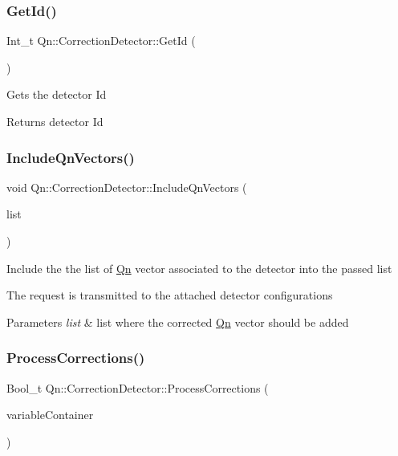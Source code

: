 \subsubsection{\texorpdfstring{Get\+Id()}{GetId()}}
{\footnotesize\ttfamily Int\+\_\+t Qn\+::\+Correction\+Detector\+::\+Get\+Id (\begin{DoxyParamCaption}{ }\end{DoxyParamCaption})\hspace{0.3cm}{\ttfamily [inline]}}

Gets the detector Id

\begin{DoxyReturn}{Returns}
detector Id 
\end{DoxyReturn}
\mbox{\label{classQn_1_1CorrectionDetector_a46b40b3743208bcf3cddd063690985e8}} 
\subsubsection{\texorpdfstring{Include\+Qn\+Vectors()}{IncludeQnVectors()}}
{\footnotesize\ttfamily void Qn\+::\+Correction\+Detector\+::\+Include\+Qn\+Vectors (\begin{DoxyParamCaption}\item[{T\+List $\ast$}]{list }\end{DoxyParamCaption})}

Include the the list of \mbox{\hyperlink{namespaceQn}{Qn}} vector associated to the detector into the passed list

The request is transmitted to the attached detector configurations 
\begin{DoxyParams}{Parameters}
{\em list} & list where the corrected \mbox{\hyperlink{namespaceQn}{Qn}} vector should be added \\
\hline
\end{DoxyParams}
\mbox{\label{classQn_1_1CorrectionDetector_a4942a3b1f05f8a7f4d899e6ae9808338}} 
\subsubsection{\texorpdfstring{Process\+Corrections()}{ProcessCorrections()}}
{\footnotesize\ttfamily Bool\+\_\+t Qn\+::\+Correction\+Detector\+::\+Process\+Corrections (\begin{DoxyParamCaption}\item[{const double $\ast$}]{variable\+Container }\end{DoxyParamCaption})\hspace{0.3cm}{\ttfamily [inline]}}


